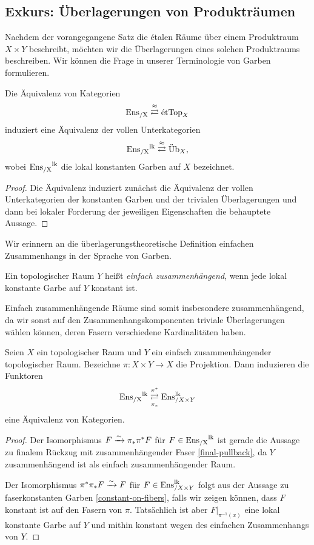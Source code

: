 \subsection{Exkurs: Überlagerungen von Produkträumen}

Nachdem der vorangegangene Satz die étalen Räume über einem
Produktraum $X \times Y$ beschreibt, möchten wir die Überlagerungen
eines solchen Produktraums beschreiben. Wir können die Frage in
unserer Terminologie von Garben formulieren.
\begin{prop}
  Die Äquivalenz von Kategorien
  \[ \operatorname{Ens_{/X}} \overset{\approx}{\rightleftarrows} \mathrm{\acute{e}tTop}_X \]
  induziert eine Äquivalenz der vollen Unterkategorien
  \[ \operatorname{Ens_{/X}}^{\operatorname{lk}} \overset{\approx}{\rightleftarrows} \mathrm{\ddot{U}b}_X, \]
  wobei $\operatorname{Ens_{/X}}^{\operatorname{lk}}$ die lokal konstanten Garben auf $X$ bezeichnet.
\end{prop}
\begin{proof}
  Die Äquivalenz induziert zunächst die Äquivalenz der vollen
  Unterkategorien der konstanten Garben und der trivialen
  Überlagerungen und dann bei lokaler Forderung der jeweiligen
  Eigenschaften die behauptete Aussage.
\end{proof}

Wir erinnern an die überlagerungstheoretische Definition einfachen
Zusammenhangs in der Sprache von Garben.
\begin{defn}
  Ein topologischer Raum $Y$ heißt \emph{einfach zusammenhängend},
  wenn jede lokal konstante Garbe auf $Y$ konstant ist.
\end{defn}
Einfach zusammenhängende Räume sind somit insbesondere
zusammenhängend, da wir sonst auf den Zusammenhangskomponenten
triviale Überlagerungen wählen können, deren Fasern verschiedene
Kardinalitäten haben.

\begin{satz}
  Seien $X$ ein topologischer Raum und $Y$ ein einfach
  zusammenhängender topologischer Raum. Bezeichne $\pi: X \times Y \to
  X$ die Projektion. Dann induzieren die Funktoren
  \[ \operatorname{Ens_{/X}}^{\operatorname{lk}}
  \mathrel{\mathop{\rightleftarrows}^{\pi^*}_{\pi_*}}
  \operatorname{Ens}_{/X \times Y}^{\operatorname{lk}} \]
  eine Äquivalenz von Kategorien.
\end{satz}
\begin{proof}
  Der Isomorphismus $F \xrightarrow[]{\sim} \pi_* \pi^* F$ für $F \in \operatorname{Ens_{/X}}^{\operatorname{lk}}$ ist
  gerade die Aussage zu finalem Rückzug mit zusammenhängender Faser
  \ref{final-pullback}, da $Y$ zusammenhängend ist als einfach
  zusammenhängender Raum.

  Der Isomorphismus $\pi^* \pi_* F \xrightarrow[]{\sim} F$ für $F \in \operatorname{Ens}_{/X \times
    Y}^{\operatorname{lk}}$ folgt aus der Aussage zu faserkonstanten Garben
  \ref{constant-on-fibers}, falls wir zeigen können, dass $F$ konstant
  ist auf den Fasern von $\pi$. Tatsächlich ist aber
  $F|_{\pi^{-1}(x)}$ eine lokal konstante Garbe auf $Y$ und mithin
  konstant wegen des einfachen Zusammenhangs von $Y$.
\end{proof}

